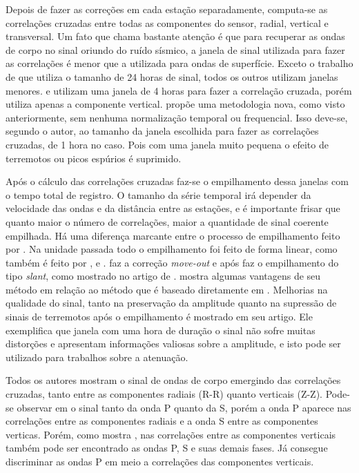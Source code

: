 \documentclass[paper,twocolumn]{geophysics}
\begin{document}
Depois de fazer as correções em cada estação separadamente, computa-se as correlações cruzadas entre todas as componentes do sensor, radial, vertical e transversal. Um fato que chama bastante atenção é que para recuperar as ondas de corpo no sinal oriundo do ruído sísmico, a janela de sinal utilizada para fazer as correlações é menor que a utilizada para ondas de superfície. Exceto o trabalho de \cite{roux_p-waves_2005} que utiliza o tamanho de 24 horas de sinal, todos os outros utilizam janelas menores. \cite{poli_emergence_2012} e \citep{boue_teleseismic_2013} utilizam uma janela de 4 horas para fazer a correlação cruzada, porém \citep{boue_teleseismic_2013} utiliza apenas a componente vertical. \cite{prieto_amplitude_2011} propõe uma metodologia nova, como visto anteriormente, sem nenhuma normalização temporal ou frequencial. Isso deve-se, segundo o autor, ao tamanho da janela escolhida para fazer as correlações cruzadas, de 1 hora no caso. Pois com uma janela muito pequena o efeito de terremotos ou picos espúrios é suprimido.

Após o cálculo das correlações cruzadas faz-se o empilhamento dessa janelas com o tempo total de registro. O tamanho da série temporal irá depender da velocidade das ondas e da distância entre as estações, e é importante frisar que quanto maior o número de correlações, maior a quantidade de sinal coerente empilhada. Há uma diferença marcante entre o processo de empilhamento feito por \citep{boue_teleseismic_2013}. Na unidade passada todo o empilhamento foi feito de forma linear, como também é feito por \cite{roux_p-waves_2005},\cite{prieto_amplitude_2011} e  \cite{poli_emergence_2012}. \citep{boue_teleseismic_2013} faz a correção \textit{move-out} e após faz o empilhamento  do tipo \textit{slant}, como mostrado no artigo de \citep{poli_body-wave_2012}. \cite{prieto_amplitude_2011} mostra algumas vantagens de seu método em relação ao método que é baseado diretamente em \cite{bensen_processing_2007}. Melhorias na qualidade do sinal, tanto na preservação da amplitude quanto na supressão de sinais de terremotos após o empilhamento é mostrado em seu artigo. Ele exemplifica que janela com uma hora de duração o sinal não sofre muitas distorções e apresentam informações valiosas sobre a amplitude, e isto pode ser utilizado para trabalhos sobre a atenuação.

Todos os autores mostram o sinal de ondas de corpo emergindo das correlações cruzadas, tanto entre as componentes radiais (R-R) quanto verticais (Z-Z). Pode-se observar em \cite{poli_emergence_2012} o sinal tanto da onda P quanto da S, porém a onda P aparece nas correlações entre as componentes radiais e a onda S entre as componentes verticas. Porém, como mostra \cite{boue_teleseismic_2013}, nas correlações entre as componentes verticais também pode ser encontrado as ondas P, S e suas demais fases. Já \cite{roux_p-waves_2005} consegue discriminar as ondas P em meio a correlações das componentes verticais. 
\end{document}
